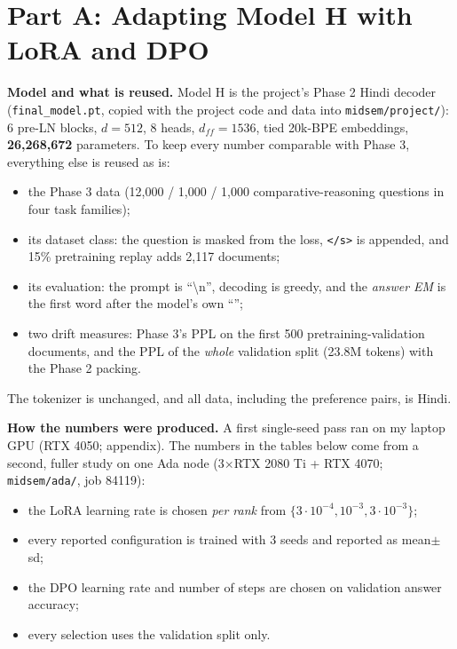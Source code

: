 \section{Part A: Adapting Model H with LoRA and DPO}
\textbf{Model and what is reused.} Model H is the project's Phase 2 Hindi decoder (\texttt{final\_model.pt}, copied with the project code and data into \texttt{midsem/project/}): 6 pre-LN blocks, $d{=}512$, 8 heads, $d_{ff}{=}1536$, tied 20k-BPE embeddings, \textbf{26,268,672} parameters. To keep every number comparable with Phase 3, everything else is reused as is:
\begin{itemize}[leftmargin=*,nosep]
\item the Phase 3 data (12,000 / 1,000 / 1,000 comparative-reasoning questions in four task families);
\item its dataset class: the question is masked from the loss, \texttt{</s>} is appended, and 15\% pretraining replay adds 2,117 documents;
\item its evaluation: the prompt is ``\textbackslash n'', decoding is greedy, and the \emph{answer EM} is the first word after the model's own ``'';
\item two drift measures: Phase 3's PPL on the first 500 pretraining-validation documents, and the PPL of the \emph{whole} validation split (23.8M tokens) with the Phase 2 packing.
\end{itemize}
The tokenizer is unchanged, and all data, including the preference pairs, is Hindi.

\textbf{How the numbers were produced.} A first single-seed pass ran on my laptop GPU (RTX 4050; appendix). The numbers in the tables below come from a second, fuller study on one Ada node (3$\times$RTX 2080 Ti + RTX 4070; \texttt{midsem/ada/}, job 84119):
\begin{itemize}[leftmargin=*,nosep]
\item the LoRA learning rate is chosen \emph{per rank} from $\{3\cdot10^{-4},10^{-3},3\cdot10^{-3}\}$;
\item every reported configuration is trained with 3 seeds and reported as mean$\pm$sd;
\item the DPO learning rate and number of steps are chosen on validation answer accuracy;
\item every selection uses the validation split only.
\end{itemize}

